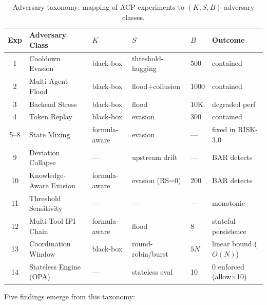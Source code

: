\documentclass[11pt]{article}
\theoremstyle{definition}
\begin{document}
\begin{table}[h!]
\centering\small
\caption{Adversary taxonomy: mapping of ACP experiments to $(K, S, B)$ adversary classes.}
\label{tab:adversary-taxonomy}
\begin{tabular}{@{}clllll@{}}
\toprule
Exp & Adversary Class & $K$ & $S$ & $B$ & Outcome \\
\midrule
1 & Cooldown Evasion       & black-box     & threshold-hugging & 500   & contained \\
2 & Multi-Agent Flood      & black-box     & flood+collusion   & 1000  & contained \\
3 & Backend Stress         & black-box     & flood             & 10K   & degraded perf \\
4 & Token Replay           & black-box     & evasion           & 300   & contained \\
5--8 & State Mixing        & formula-aware & evasion           & —     & fixed in RISK-3.0 \\
9 & Deviation Collapse     & —             & upstream drift    & —     & BAR detects \\
10 & Knowledge-Aware Evasion & formula-aware & evasion (RS=0) & 200   & BAR detects \\
11 & Threshold Sensitivity  & —             & —                 & —     & monotonic \\
12 & Multi-Tool IPI Chain   & formula-aware & flood             & 8     & stateful persistence \\
13 & Coordination Window    & black-box     & round-robin/burst & $5N$  & linear bound ($O(N)$) \\
14 & Stateless Engine (OPA) & —             & stateless eval    & 10    & 0 enforced (allow$\times$10) \\
\bottomrule
\end{tabular}
\end{table}

Five findings emerge from this taxonomy:
\end{document}

